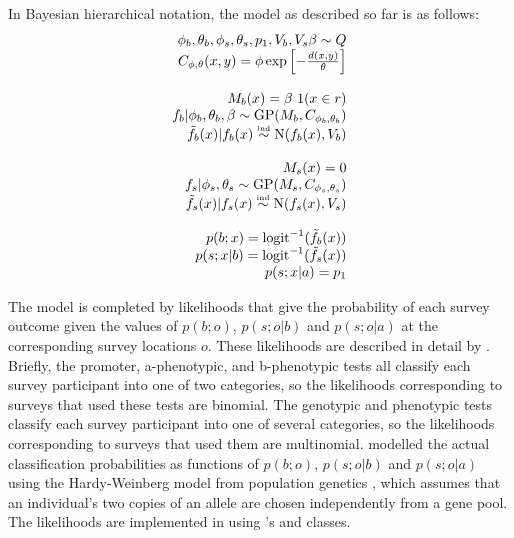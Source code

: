 \documentclass[article]{jss}
\begin{document}
In Bayesian hierarchical notation, the model as described so far is as follows:
\begin{equation}
    \label{eq:duffy-model} 
    \begin{array}{r}
        \phi_b,\theta_b,\phi_s,\theta_s,p_1,V_b,V_s\beta\sim Q\\
        C_{\phi,\theta}(x,y)=\phi\exp\left[{-\frac{d(x,y)}{\theta}}\right]\\\\
        M_b(x) = \beta\ 1(x\in r)\\
        f_b|\phi_b,\theta_b,\beta\sim \textup{GP}(M_b, C_{\phi_b,\theta_b}) \\
        \tilde f_b(x) | f_b(x) \stackrel{\textup{\tiny ind}}{\sim} \textup{N}(f_b(x),V_b) \\\\
        M_s(x) = 0\\
        f_s|\phi_s,\theta_s\sim \textup{GP}(M_s, C_{\phi_s,\theta_s})\\
        \tilde f_s(x) | f_s(x) \stackrel{\textup{\tiny ind}}{\sim} \textup{N}(f_s(x),V_s)\\\\
        p(b;x) = \textup{logit}^{-1}(\tilde f_b(x))\\
        p(s;x|b)= \textup{logit}^{-1}(\tilde f_s(x))\\
        p(s;x|a)= p_1
    \end{array}
\end{equation}  

The model is completed by likelihoods that give the probability of each survey outcome given the values of $p(b;o)$, $p(s;o|b)$ and $p(s;o|a)$ at the corresponding survey locations $o$. These likelihoods are described in detail by \cite{Howes}. Briefly, the promoter, a-phenotypic, and b-phenotypic tests all classify each survey participant into one of two categories, so the likelihoods corresponding to surveys that used these tests are binomial. The genotypic and phenotypic tests classify each survey participant into one of several categories, so the likelihoods corresponding to surveys that used them are multinomial. \cite{Howes} modelled the actual classification probabilities as functions of $p(b;o)$, $p(s;o|b)$ and $p(s;o|a)$ using the Hardy-Weinberg model from population genetics \citep{gillespie}, which assumes that an individual's two copies of an allele are chosen independently from a gene pool. 
The likelihoods are implemented in  using 's  and  classes.
\end{document}

